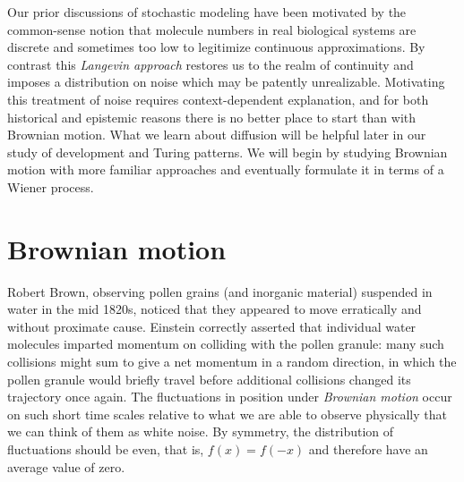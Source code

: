 \documentclass{article}
\begin{document}
Our prior discussions of stochastic modeling have been motivated by the common-sense notion that molecule numbers in real biological systems are discrete and sometimes too low to legitimize continuous approximations. By contrast this \textit{Langevin approach} restores us to the realm of continuity and imposes a distribution on noise which may be patently unrealizable. Motivating this treatment of noise requires context-dependent explanation, and for both historical and epistemic reasons there is no better place to start than with Brownian motion. What we learn about diffusion will be helpful later in our study of development and Turing patterns. We will begin by studying Brownian motion with more familiar approaches and eventually formulate it in terms of a Wiener process.

\section*{Brownian motion}

Robert Brown, observing pollen grains (and inorganic material) suspended in water in the mid 1820s, noticed that they appeared to move erratically and without proximate cause. Einstein correctly asserted that individual water molecules imparted momentum on colliding with the pollen granule: many such collisions might sum to give a net momentum in a random direction, in which the pollen granule would briefly travel before additional collisions changed its trajectory once again. The fluctuations in position under \textit{Brownian motion} occur on such short time scales relative to what we are able to observe physically that we can think of them as white noise. By symmetry, the distribution of fluctuations should be even, that is, $f(x)=f(-x)$ and therefore have an average value of zero.\\
\end{document}
